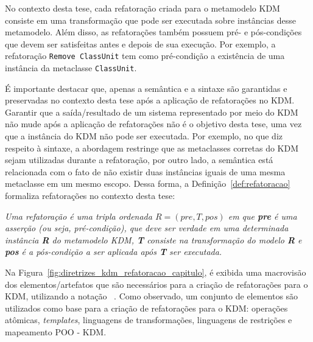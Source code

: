 No contexto desta tese, cada refatoração criada para o metamodelo KDM consiste em uma transformação que pode ser executada sobre instâncias desse metamodelo. Além disso, as refatorações também possuem pré- e pós-condições que devem ser satisfeitas antes e depois de sua execução. Por exemplo, a refatoração \texttt{Remove ClassUnit} tem como pré-condição a existência de uma instância da metaclasse \texttt{ClassUnit}. %

É importante destacar que, apenas a semântica e a sintaxe são garantidas e preservadas no contexto desta tese após a aplicação de refatorações no KDM. Garantir que a saída/resultado de um sistema representado por meio do KDM não mude após a aplicação de refatorações não é o objetivo desta tese, uma vez que a instância do KDM não pode ser executada. %
Por exemplo, no que diz respeito à sintaxe, a abordagem restringe que as metaclasses corretas do KDM sejam utilizadas durante a refatoração, por outro lado, a semântica está relacionada com o fato de não existir duas instâncias iguais de uma mesma metaclasse em um mesmo escopo. Dessa forma, a Definição~\ref{def:refatoracao} formaliza refatorações no contexto desta tese:


\begin{definicao}\label{def:refatoracao}
    \textit{Uma refatoração é uma tripla ordenada $R = (pre, T, pos)$ em que \textbf{pre} é uma asserção (ou seja, pré-condição), que deve ser verdade em uma determinada instância \textbf{R} do metamodelo KDM, \textbf{T} consiste na transformação do modelo \textbf{R} e \textbf{pos} é a pós-condição a ser aplicada após \textbf{T} ser executada.}
\end{definicao}


Na Figura~\ref{fig:diretrizes_kdm_refatoracao_capitulo}, é exibida uma macrovisão dos elementos/artefatos que são necessários para a criação de refatorações para o KDM, utilizando a notação ~\cite{Marca_1987}. Como observado, um conjunto de elementos são utilizados como base para a criação de refatorações para o KDM: operações atômicas, \textit{templates}, linguagens de transformações, linguagens de restrições e mapeamento POO - KDM. 

